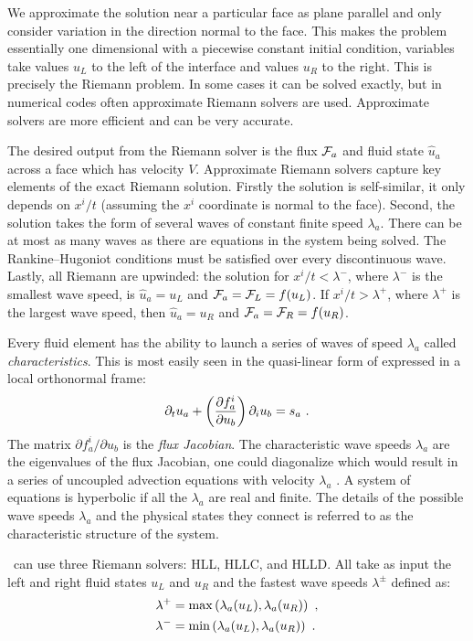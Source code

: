 We approximate the solution near a particular face as plane parallel and only consider variation in the direction normal to the face.  This makes the problem essentially one dimensional with a piecewise constant initial condition, variables take values $u_L$ to the left of the interface and values $u_R$ to the right.  This is precisely the Riemann problem. In some cases it can be solved exactly, but in numerical codes often approximate Riemann solvers are used.  Approximate solvers are more efficient and can be very accurate.

The desired output from the Riemann solver is the flux $\mathcal{F}_a$ and fluid state $\widehat{u}_a$ across a face which has velocity $V$. Approximate Riemann solvers capture key elements of the exact Riemann solution. Firstly the solution is self-similar, it only depends on $x^i/t$ (assuming the $x^i$ coordinate is normal to the face).  Second, the solution takes the form of several waves of constant finite speed $\lambda_a$.  There can be at most as many waves as there are equations in the system being solved.  The Rankine--Hugoniot conditions must be satisfied over every discontinuous wave.  Lastly, all Riemann are upwinded: the solution for $x^i/t < \lambda^-$, where $\lambda^-$ is the smallest wave speed, is $\widehat{u}_a = u_L$ and $\mathcal{F}_a = \mathcal{F}_L = f(u_L)$.  If $x^i/t >\lambda^+$, where $\lambda^+$ is the largest wave speed, then $\widehat{u}_a = u_R$ and $\mathcal{F}_a = \mathcal{F}_R = f(u_R)$.

Every fluid element has the ability to launch a series of waves of speed $\lambda_a$ called \emph{characteristics}.  This is most easily seen in the quasi-linear form of  expressed in a local orthonormal frame:
\begin{equation}
	\partial_t u_a + \left(\frac{\partial f^i_a}{\partial u_b}\right)\partial_i u_b = s_a\ . \eqlabel{quasilinear}
\end{equation}
The matrix $\partial f^i_a / \partial u_b$ is the \emph{flux Jacobian}.  The characteristic wave speeds $\lambda_a$ are the eigenvalues of the flux Jacobian, one could diagonalize  which would result in a series of uncoupled advection equations with velocity $\lambda_a$ \citep{Leveque97}.  A system of equations is hyperbolic if all the $\lambda_a$ are real and finite.  The details of the possible wave speeds $\lambda_a$ and the physical states they connect is referred to as the characteristic structure of the system.

\discogr\ can use three Riemann solvers: HLL, HLLC, and HLLD.  All take as input the left and right fluid states $u_L$ and $u_R$ and the fastest wave speeds $\lambda^\pm$ defined as:
\begin{align}
	\lambda^+ &= \max\left( \lambda_a(u_L), \lambda_a(u_R)\right)\ , \\
	\lambda^- &= \min\left( \lambda_a(u_L), \lambda_a(u_R)\right)\ .
\end{align}

